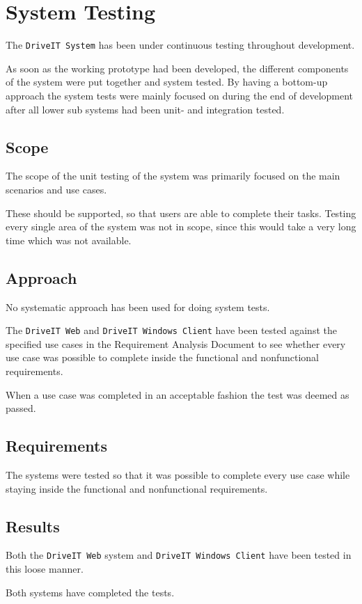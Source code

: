 \section{System Testing}
The \texttt{DriveIT System} has been under continuous testing throughout development.

As soon as the working prototype had been developed, the different components of the system were put together and system tested. 
By having a bottom-up approach the system tests were mainly focused on during the end of development after all lower sub systems had been unit- and integration tested.

\subsection{Scope}
The scope of the unit testing of the system was primarily focused on the main scenarios and use cases. 

These should be supported, so that users are able to complete their tasks. Testing every single area of the system was not in scope, since this would take a very long time which was not available.

\subsection{Approach}
No systematic approach has been used for doing system tests. 

The \texttt{DriveIT Web} and \texttt{DriveIT Windows Client} have been tested against the specified use cases in the Requirement Analysis Document to see whether every use case was possible to complete inside the functional and nonfunctional requirements.

When a use case was completed in an acceptable fashion the test was deemed as passed.

\subsection{Requirements}
The systems were tested so that it was possible to complete every use case while staying inside the functional and nonfunctional requirements.

\subsection{Results}
Both the \texttt{DriveIT Web} system and \texttt{DriveIT Windows Client} have been tested in this loose manner. 

Both systems have completed the tests.